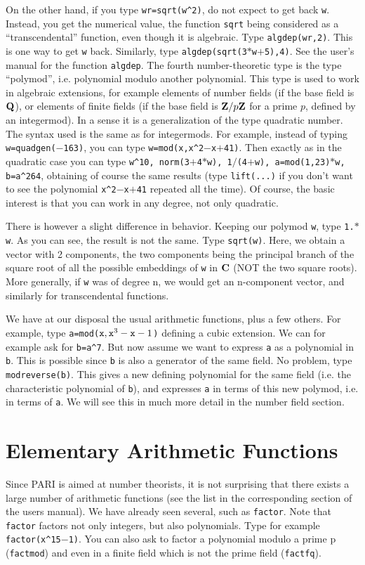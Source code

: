 On the other hand, if you type {\tt wr=sqrt(w\^{}2)}, do not expect to get back
{\tt w}. Instead, you get the numerical value, the function {\tt sqrt} being
considered as a ``transcendental'' function, even though it is algebraic.
Type {\tt algdep(wr,2)}. This is one way to get {\tt w} back. Similarly,
type {\tt algdep(sqrt(3$*$w$+$5),4)}. See the user's manual for the function
{\tt algdep}.
\smallskip
The fourth number-theoretic type is the type ``polymod'', i.e. polynomial
modulo another polynomial. This type is used to work in algebraic extensions,
for example elements of number fields (if the base field is $\Bbb Q$), or
elements of finite fields (if the base field is $\Z/p\Z$ for a prime $p$,
defined by an integermod). In a sense it is a generalization of the type
quadratic number. The syntax used is the same as for integermods.
For example, instead of typing {\tt w=quadgen($-$163)}, you can type
{\tt w=mod(x,x\^{}2$-$x$+$41)}. Then exactly as in the quadratic case you can
type {\tt w\^{}10, norm(3$+$4$*$w), 1$/$(4$+$w), a=mod(1,23)$*$w, b=a\^{}264},
obtaining of course the same results (type {\tt lift(...)} if you don't want
to see the polynomial {\tt x\^{}2$-$x$+$41} repeated all the time). Of course,
the basic interest is that you can work in any degree, not only quadratic.

There is however a slight difference in behavior. Keeping our polymod {\tt w},
type {\tt 1.$*$w}. As you can see, the result is not the same. Type
{\tt sqrt(w)}. Here, we obtain a vector with 2 components, the two components
being the principal branch of the square root of all the possible embeddings
of {\tt w} in $\Bbb C$ (NOT the two square roots). More generally, if {\tt w}
was of degree n, we would get an n-component vector, and similarly for
transcendental functions.

We have at our disposal the usual arithmetic functions, plus a few others.
For example, type {\tt a=mod($\x,\x^3-\x-1$)} defining a cubic extension.
We can for example ask for {\tt b=a\^{}7}. But now assume we want to express
{\tt a} as a polynomial in {\tt b}. This is possible since {\tt b} is also a
generator of the same field. No problem, type {\tt modreverse(b)}. This gives
a new defining polynomial for the same field (i.e. the characteristic 
polynomial of {\tt b}), and expresses {\tt a} in terms of this new polymod, i.e.
in terms of {\tt a}. We will see this in much more detail in the number field
section.
\medskip
\section{Elementary Arithmetic Functions}
\medskip
Since PARI is aimed at number theorists, it is not surprising that there
exists a large number of arithmetic functions (see the list in the 
corresponding section of the users manual). We have already seen several, such
as {\tt factor}. Note that {\tt factor} factors not only integers, but also
polynomials. Type for example {\tt factor(x\^{}15$-$1)}. You can also ask to
factor a polynomial modulo a prime p ({\tt factmod}) and even in a finite
field which is not the prime field ({\tt factfq}).

